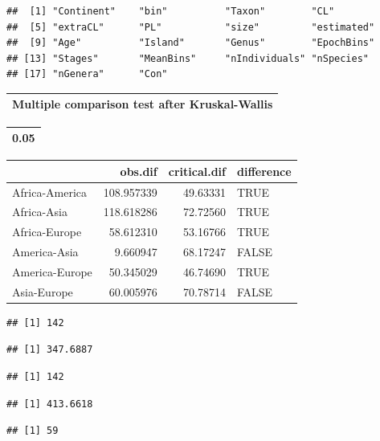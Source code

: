 \documentclass[]{article}
\begin{document}
\begin{verbatim}
##  [1] "Continent"    "bin"          "Taxon"        "CL"          
##  [5] "extraCL"      "PL"           "size"         "estimated"   
##  [9] "Age"          "Island"       "Genus"        "EpochBins"   
## [13] "Stages"       "MeanBins"     "nIndividuals" "nSpecies"    
## [17] "nGenera"      "Con"
\end{verbatim}

\begin{table}

\centering
\begin{tabular}[t]{l}
\hline
Multiple comparison test after Kruskal-Wallis\\
\hline
\end{tabular}
\centering
\begin{tabular}[t]{r}
\hline
0.05\\
\hline
\end{tabular}
\centering
\begin{tabular}[t]{l|r|r|l}
\hline
  & obs.dif & critical.dif & difference\\
\hline
Africa-America & 108.957339 & 49.63331 & TRUE\\
\hline
Africa-Asia & 118.618286 & 72.72560 & TRUE\\
\hline
Africa-Europe & 58.612310 & 53.16766 & TRUE\\
\hline
America-Asia & 9.660947 & 68.17247 & FALSE\\
\hline
America-Europe & 50.345029 & 46.74690 & TRUE\\
\hline
Asia-Europe & 60.005976 & 70.78714 & FALSE\\
\hline
\end{tabular}
\end{table}

\begin{verbatim}
## [1] 142
\end{verbatim}

\begin{verbatim}
## [1] 347.6887
\end{verbatim}

\begin{verbatim}
## [1] 142
\end{verbatim}

\begin{verbatim}
## [1] 413.6618
\end{verbatim}

\begin{verbatim}
## [1] 59
\end{verbatim}
\end{document}
